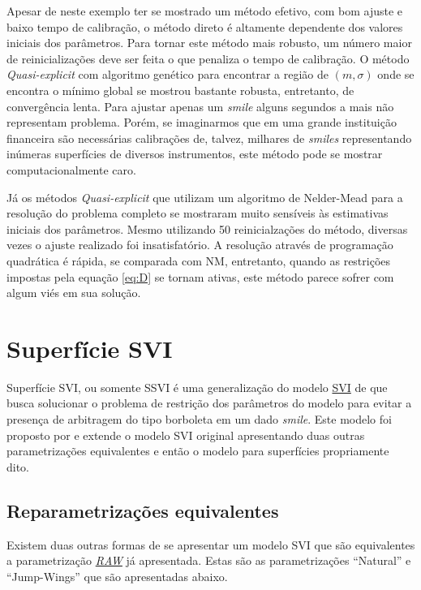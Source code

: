 \documentclass[]{book}
\theoremstyle{definition}
\theoremstyle{definition}
\theoremstyle{definition}
\theoremstyle{remark}
\begin{document}
Apesar de neste exemplo ter se mostrado um método efetivo, com bom
ajuste e baixo tempo de calibração, o método direto é altamente
dependente dos valores iniciais dos parâmetros. Para tornar este método
mais robusto, um número maior de reinicializações deve ser feita o que
penaliza o tempo de calibração. O método \emph{Quasi-explicit} com
algoritmo genético para encontrar a região de \((m, \sigma)\) onde se
encontra o mínimo global se mostrou bastante robusta, entretanto, de
convergência lenta. Para ajustar apenas um \emph{smile} alguns segundos
a mais não representam problema. Porém, se imaginarmos que em uma grande
instituição financeira são necessárias calibrações de, talvez, milhares
de \emph{smiles} representando inúmeras superfícies de diversos
instrumentos, este método pode se mostrar computacionalmente caro.

Já os métodos \emph{Quasi-explicit} que utilizam um algoritmo de
Nelder-Mead para a resolução do problema completo se mostraram muito
sensíveis às estimativas iniciais dos parâmetros. Mesmo utilizando 50
reinicialzações do método, diversas vezes o ajuste realizado foi
insatisfatório. A resolução através de programação quadrática é rápida,
se comparada com NM, entretanto, quando as restrições impostas pela
equação \eqref{eq:D} se tornam ativas, este método parece sofrer com algum
viés em sua solução.

\chapter{Superfície SVI}\label{ssvi}

Superfície SVI, ou somente SSVI é uma generalização do modelo
\protect\hyperlink{svi}{SVI} de \citep{Gatheral2004} que busca
solucionar o problema de restrição dos parâmetros do modelo para evitar
a presença de arbitragem do tipo borboleta em um dado \emph{smile}. Este
modelo foi proposto por \citep{Gatheral2014} e extende o modelo SVI
original apresentando duas outras parametrizações equivalentes e então o
modelo para superfícies propriamente dito.

\section{Reparametrizações
equivalentes}\label{reparametrizacoes-equivalentes}

Existem duas outras formas de se apresentar um modelo SVI que são
equivalentes a parametrização
\protect\hyperlink{superficies}{\emph{RAW}} já apresentada. Estas são as
parametrizações ``Natural'' e ``Jump-Wings'' que são apresentadas
abaixo.
\end{document}
